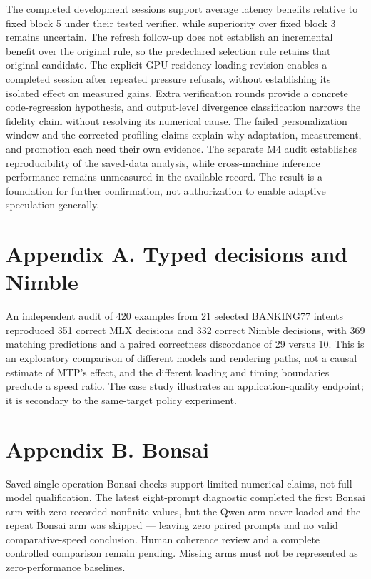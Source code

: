 \documentclass[
  11pt,
]{article}
\begin{document}
The completed development sessions support average latency benefits
relative to fixed block 5 under their tested verifier, while superiority
over fixed block 3 remains uncertain. The refresh follow-up does not
establish an incremental benefit over the original rule, so the
predeclared selection rule retains that original candidate. The explicit
GPU residency loading revision enables a completed session after
repeated pressure refusals, without establishing its isolated effect on
measured gains. Extra verification rounds provide a concrete
code-regression hypothesis, and output-level divergence classification
narrows the fidelity claim without resolving its numerical cause. The
failed personalization window and the corrected profiling claims explain
why adaptation, measurement, and promotion each need their own evidence.
The separate M4 audit establishes reproducibility of the saved-data
analysis, while cross-machine inference performance remains unmeasured
in the available record. The result is a foundation for further
confirmation, not authorization to enable adaptive speculation
generally.

\section{Appendix A. Typed decisions and
Nimble}\label{appendix-a.-typed-decisions-and-nimble}

An independent audit of 420 examples from 21 selected BANKING77 intents
reproduced 351 correct MLX decisions and 332 correct Nimble decisions,
with 369 matching predictions and a paired correctness discordance of 29
versus 10. This is an exploratory comparison of different models and
rendering paths, not a causal estimate of MTP's effect, and the
different loading and timing boundaries preclude a speed ratio. The case
study illustrates an application-quality endpoint; it is secondary to
the same-target policy experiment.

\section{Appendix B. Bonsai}\label{appendix-b.-bonsai}

Saved single-operation Bonsai checks support limited numerical claims,
not full-model qualification. The latest eight-prompt diagnostic
completed the first Bonsai arm with zero recorded nonfinite values, but
the Qwen arm never loaded and the repeat Bonsai arm was skipped ---
leaving zero paired prompts and no valid comparative-speed conclusion.
Human coherence review and a complete controlled comparison remain
pending. Missing arms must not be represented as zero-performance
baselines.


\end{document}
